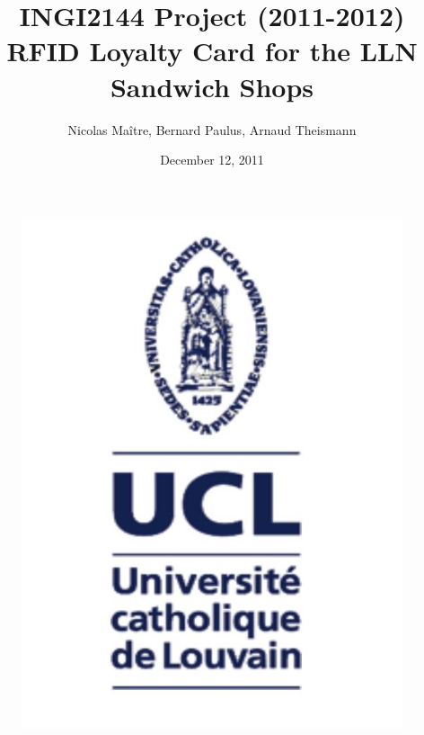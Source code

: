 \documentclass[a4paper,11pt,oneside]{article}
\begin{document}
\begin{titlepage}
	\title{INGI2144 Project (2011-2012) \\ RFID Loyalty Card for the LLN Sandwich Shops}
	\author{Nicolas Maître, Bernard Paulus, Arnaud Theismann}
	\date{December 12, 2011}
	\maketitle
	\thispagestyle{empty}
	\vfill
	\vfill
	\begin{figure}[!ht]
		\centering
		\includegraphics[scale=0.15]{Images/UCL_Logo.jpg}
		\label{fig:UCL Logo}
	\end{figure}
\end{titlepage}

\tableofcontents
\end{document}
